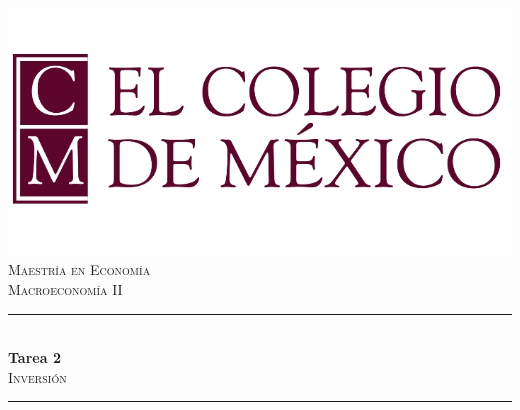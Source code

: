 \begin{titlepage}
	
	\newcommand{\HRule}{\rule{\linewidth}{0.5mm}} %
	
	\center %
	
	\includegraphics[]{colmex.jpg}\\ %
	
	\textsc{\Large Maestría en Economía}\\[1cm] %
	\textsc{\large  Macroeconomía II}\\[1.5cm] 
	
	
	\HRule \\[0.4cm]
	{ \Large \bfseries Tarea 2}\\[0.4cm] %
	\textsc{\Large Inversión}\\[1cm] %
	\HRule \\[1.2cm]
	
	

\end{titlepage}
